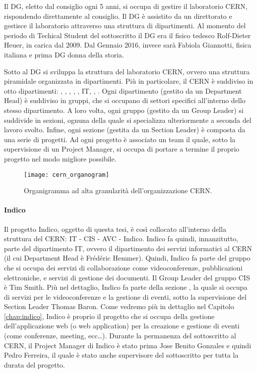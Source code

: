 			Il \ac{DG}, eletto dal consiglio ogni 5 anni, si occupa di gestire il laboratorio \ac{CERN}, rispondendo direttamente al consiglio. Il \ac{DG} è assistito da un direttorato e gestisce il laboratorio attraverso una struttura di dipartimenti. Al momento del periodo di Techical Student del sottoscritto il \ac{DG} era il fisico tedesco Rolf-Dieter Heuer, in carica dal 2009. Dal Gennaio 2016, invece sarà Fabiola Giannotti, fisica italiana e prima \ac{DG} donna della storia.
			
			Sotto al \ac{DG} si sviluppa la struttura del laboratorio \ac{CERN}, ovvero una struttura piramidale organizzata in dipartimenti. Più in particolare, il \ac{CERN} è suddiviso in otto dipartimenti: , , , , , \ac{IT}, , . Ogni dipartimento (gestito da un Department Head) è suddiviso in gruppi, che si occupano di settori specifici all'interno dello stesso dipartimento. A loro volta, ogni gruppo (gestito da un Group Leader) si suddivide in sezioni, ognuna della quale si specializza ulteriormente a seconda del lavoro svolto. Infine, ogni sezione (gestita da un Section Leader) è composta da una serie di progetti. Ad ogni progetto è associato un team il quale, sotto la supervisione di un Project Manager, si occupa di portare a termine il proprio progetto nel modo migliore possibile. \cite{cern:structure}

			\begin{figure}[h!]
				\begin{center}
					\texttt{[image: cern\_organogram]}
				\end{center}
				\caption[Organigramma del CERN]{Organigramma ad alta granularità dell'organizzazione CERN.}
				\label{fig:cern_organogram}
			\end{figure}
			
			\paragraph{Indico}Il progetto Indico, oggetto di questa tesi, è così collocato all'interno della struttura del \ac{CERN}: \ac{IT} - \acs{CIS} - \acs{AVC} - Indico. Indico fa quindi, innanzitutto, parte del dipartimento \ac{IT}, ovvero il dipartimento dei servizi informatici al \ac{CERN} (il cui Department Head è Frédéric Hemmer). Quindi, Indico fa parte del gruppo  che si occupa dei servizi di collaborazione come videoconferenze, pubblicazioni elettroniche, e servizi di gestione dei documenti. Il Group Leader del gruppo \ac{CIS} è Tim Smith. Più nel dettaglio, Indico fa parte della sezione , la quale si occupa di servizi per le videoconferenze e la gestione di eventi, sotto la supervisione del Section Leader Thomas Baron. Come vedremo più in dettaglio nel Capitolo \ref{chap:indico}, Indico è proprio il progetto che si occupa della gestione dell'applicazione web (o web application) per la creazione e gestione di eventi (come conferenze, meeting, ecc\dots). Durante la permanenza del sottoscritto al \ac{CERN}, il Project Manager di Indico è stato prima Jose Benito Gonzales e quindi Pedro Ferreira, il quale è stato anche supervisore del sottoscritto per tutta la durata del progetto.
		
